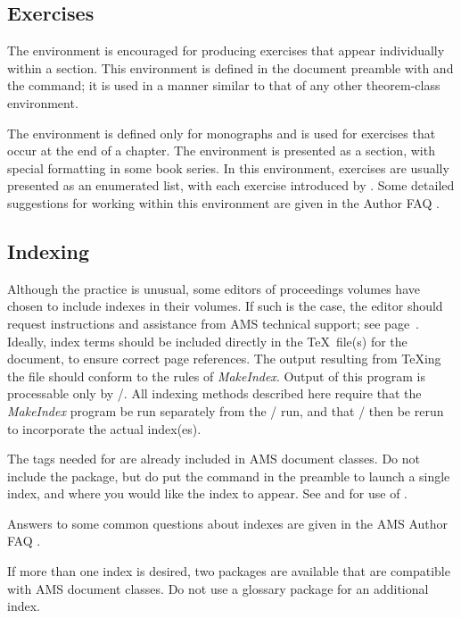\subsection{Exercises}
The  environment is encouraged for producing exercises that
appear individually within a section.  This environment is defined in
the document preamble with  and the
 command; it is used in a manner similar to that of
any other theorem-class environment.

\ifmonograph
The  environment is defined only for monographs and is used for
exercises that occur at the end of a chapter.  The environment is presented
as a section, with special formatting in some book series.  In this
environment, exercises are usually presented as an enumerated list, with each
exercise introduced by .  Some detailed suggestions for working
within this environment are given in the Author FAQ \cite{FAQ}.
\fi

\ifjournal
\else
\subsection{Indexing}
\label{ss:indexing}
\ifproceedings
Although the practice is unusual, some editors of proceedings volumes
have chosen to include indexes in their volumes.  If such is the case,
the editor should request instructions and assistance from AMS
technical support; see page~\pageref{sec:amsresources}.
\else
Ideally, index terms should be included directly
in the \TeX\ file(s) for the document, to ensure correct page references.
The output resulting from \TeX ing the file should conform to the rules
of \textit{MakeIndex}. Output of this program is processable only by
\latex/.  All indexing methods described here require that the
\textit{MakeIndex} program be run separately from the \latex/ run,
and that \latex/ then be rerun to incorporate the actual index(es).

The tags needed for  are already included in AMS document
classes.  Do not include the  package, but do put the
command  in the preamble to launch a single index, and
 where you would like the index to appear.
See \cite[chapter 11]{MG} and \cite[chapter 11]{KD} for use of
.

Answers to some common questions about indexes are given in the AMS
Author FAQ \cite{FAQ}.

If more than one index is desired, two packages are available
that are compatible with AMS document classes.  Do not use a glossary
package for an additional index.

